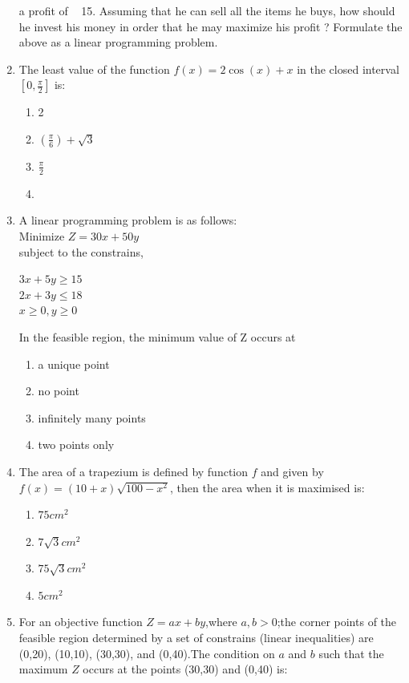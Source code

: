 \documentclass{article}
\begin{document}
\begin{enumerate}
a profit of \rupee~ 15. Assuming that he can sell all the items he buys, how
should he invest his money in order that he may maximize his profit ?
Formulate the above as a linear programming problem.
\item The least value of the function $f(x)=2\cos(x) + x$ in the closed interval $\left[{0,\frac{\pi}{2}}\right]$ is: 
\begin{enumerate}
    \item  2
    \item  $\left(\frac{\pi}{6}\right) + \sqrt{3}$
    \item  $\frac{\pi}{2}$
    \item  {}
\end{enumerate}
\item A linear programming problem is as follows:\\
Minimize $Z=30x+50y$\\
subject to the constrains,\\
\begin{center}
    $3x+5y \geq 15$\\
    $2x+3y \leq 18$\\
    $x \geq 0,y \geq 0$
    \end{center}
In the feasible region, the minimum value of Z occurs at 
\begin{enumerate}
    \item a unique point 
    \item no point
    \item infinitely many points 
    \item two points only
\end{enumerate}
\item The area of a trapezium is defined by function $f$
and given by $f(x)=(10+x)\sqrt{100-x^2}$, then the area when it is maximised is:\\
\begin{enumerate}
    \item $75cm^2$
    \item $7\sqrt{3}cm^2$
    \item $75\sqrt{3}cm^2$
    \item $5cm^2$
\end{enumerate}
\item For an objective function $Z=ax+by$,where $a,b>0$;the corner points of the feasible region determined by a set of constrains (linear inequalities) are (0,20), (10,10), (30,30), and (0,40).The condition on $a$ and $b$ such that the maximum $Z$ occurs at the points (30,30) and (0,40) is: 

\end{enumerate}
\end{document}
